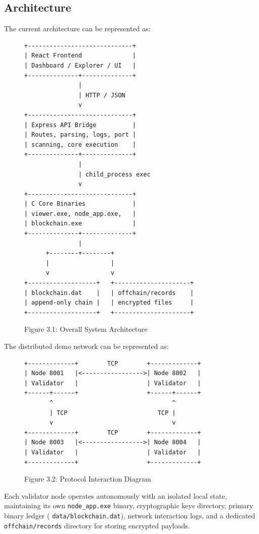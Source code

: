 \documentclass[12pt]{article}
\begin{document}
\subsection{Architecture}

The current architecture can be represented as:

\begin{figure}[htbp]
\centering
\scriptsize
\begin{verbatim}
+-----------------------------+
| React Frontend              |
| Dashboard / Explorer / UI   |
+--------------+--------------+
               |
               | HTTP / JSON
               v
+-----------------------------+
| Express API Bridge          |
| Routes, parsing, logs, port |
| scanning, core execution    |
+--------------+--------------+
               |
               | child_process exec
               v
+-----------------------------+
| C Core Binaries             |
| viewer.exe, node_app.exe,   |
| blockchain.exe              |
+--------------+--------------+
               |
      +--------+--------+
      |                 |
      v                 v
+-------------------+   +---------------------+
| blockchain.dat    |   | offchain/records    |
| append-only chain |   | encrypted files     |
+-------------------+   +---------------------+
\end{verbatim}
\label{fig:3.1}
\caption*{Figure 3.1: Overall System Architecture}
\end{figure}

The distributed demo network can be represented as:

\begin{figure}[htbp]
\centering
\scriptsize
\begin{verbatim}
+-------------+        TCP        +-------------+
| Node 8001   |<----------------->| Node 8002   |
| Validator   |                   | Validator   |
+------+------+                   +------+------+
       ^                                 ^
       | TCP                         TCP |
       v                                 v
+-------------+        TCP        +-------------+
| Node 8003   |<----------------->| Node 8004   |
| Validator   |                   | Validator   |
+-------------+                   +-------------+
\end{verbatim}
\label{fig:3.2}
\caption*{Figure 3.2: Protocol Interaction Diagram}
\end{figure}

Each validator node operates autonomously with an isolated local state, maintaining its own \texttt{node\_app.exe} binary, cryptographic keys directory, primary binary ledger ( \texttt{data/blockchain.dat}), network interaction logs, and a dedicated \texttt{offchain/records} directory for storing encrypted payloads.
\end{document}
